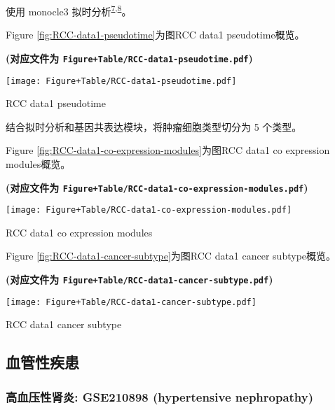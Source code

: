 \documentclass[
]{article}
\begin{document}
使用 monocle3 拟时分析\textsuperscript{\protect\hyperlink{ref-ReversedGraphQiuX2017}{7},\protect\hyperlink{ref-TheDynamicsAnTrapne2014}{8}}。

Figure \ref{fig:RCC-data1-pseudotime}为图RCC data1 pseudotime概览。

\textbf{(对应文件为 \texttt{Figure+Table/RCC-data1-pseudotime.pdf})}

\def\@captype{figure}
\begin{center}
\texttt{[image: Figure+Table/RCC-data1-pseudotime.pdf]}
\caption{RCC data1 pseudotime}\label{fig:RCC-data1-pseudotime}
\end{center}

结合拟时分析和基因共表达模块，将肿瘤细胞类型切分为 5 个类型。

Figure \ref{fig:RCC-data1-co-expression-modules}为图RCC data1 co expression modules概览。

\textbf{(对应文件为 \texttt{Figure+Table/RCC-data1-co-expression-modules.pdf})}

\def\@captype{figure}
\begin{center}
\texttt{[image: Figure+Table/RCC-data1-co-expression-modules.pdf]}
\caption{RCC data1 co expression modules}\label{fig:RCC-data1-co-expression-modules}
\end{center}

Figure \ref{fig:RCC-data1-cancer-subtype}为图RCC data1 cancer subtype概览。

\textbf{(对应文件为 \texttt{Figure+Table/RCC-data1-cancer-subtype.pdf})}

\def\@captype{figure}
\begin{center}
\texttt{[image: Figure+Table/RCC-data1-cancer-subtype.pdf]}
\caption{RCC data1 cancer subtype}\label{fig:RCC-data1-cancer-subtype}
\end{center}

\hypertarget{ux8840ux7ba1ux6027ux75beux60a3}{%
\subsection{血管性疾患}\label{ux8840ux7ba1ux6027ux75beux60a3}}

\hypertarget{ux9ad8ux8840ux538bux6027ux80beux708e-gse210898-hypertensive-nephropathy}{%
\subsubsection{高血压性肾炎: GSE210898 (hypertensive nephropathy)}\label{ux9ad8ux8840ux538bux6027ux80beux708e-gse210898-hypertensive-nephropathy}}
\end{document}
